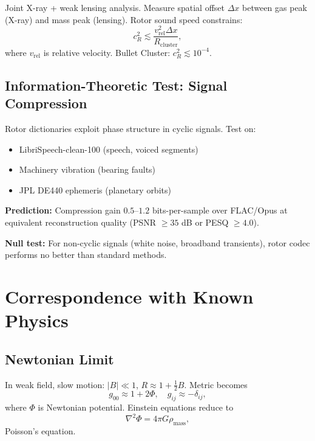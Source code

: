 \documentclass[11pt,a4paper]{article}
\numberwithin{equation}{section}
\theoremstyle{plain}
\theoremstyle{definition}
\theoremstyle{remark}
\begin{document}
Joint X-ray + weak lensing analysis. Measure spatial offset $\Delta x$ between gas peak (X-ray) and mass peak (lensing). Rotor sound speed constrains:
\begin{equation}
c_R^2 \lesssim \frac{v_{\mathrm{rel}}^2 \Delta x}{R_{\mathrm{cluster}}},
\end{equation}
where $v_{\mathrm{rel}}$ is relative velocity. Bullet Cluster: $c_R^2 \lesssim 10^{-4}$.

\subsection{Information-Theoretic Test: Signal Compression}

Rotor dictionaries exploit phase structure in cyclic signals. Test on:
\begin{itemize}
\item LibriSpeech-clean-100 (speech, voiced segments)
\item Machinery vibration (bearing faults)
\item JPL DE440 ephemeris (planetary orbits)
\end{itemize}

\textbf{Prediction:} Compression gain $0.5$–$1.2$ bits-per-sample over FLAC/Opus at equivalent reconstruction quality (PSNR $\geq 35$ dB or PESQ $\geq 4.0$).

\textbf{Null test:} For non-cyclic signals (white noise, broadband transients), rotor codec performs no better than standard methods.

\section{Correspondence with Known Physics}
\label{sec:correspondence}

\subsection{Newtonian Limit}

In weak field, slow motion: $|B| \ll 1$, $R \approx 1 + \frac{1}{2}B$. Metric becomes
\begin{equation}
g_{00} \approx 1 + 2\Phi, \quad g_{ij} \approx -\delta_{ij},
\end{equation}
where $\Phi$ is Newtonian potential. Einstein equations reduce to
\begin{equation}
\nabla^2\Phi = 4\pi G\rho_{\mathrm{mass}},
\end{equation}
Poisson's equation.
\end{document}
